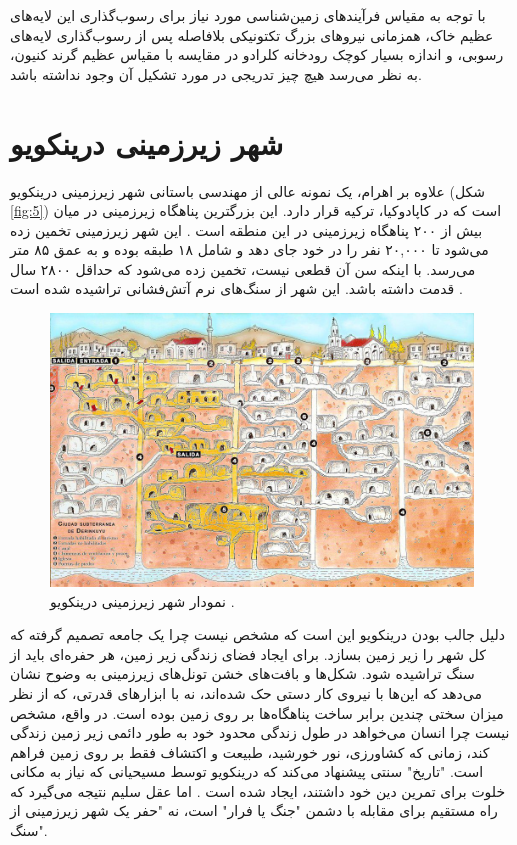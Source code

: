 \documentclass[10pt,twocolumn,letterpaper]{article}
\begin{document}
با توجه به مقیاس فرآیندهای زمین‌شناسی مورد نیاز برای رسوب‌گذاری این لایه‌های عظیم خاک، همزمانی نیروهای بزرگ تکتونیکی بلافاصله پس از رسوب‌گذاری لایه‌های رسوبی، و اندازه بسیار کوچک رودخانه کلرادو در مقایسه با مقیاس عظیم گرند کنیون، به نظر می‌رسد هیچ چیز تدریجی در مورد تشکیل آن وجود نداشته باشد.

\section{شهر زیرزمینی درینکویو}

علاوه بر اهرام، یک نمونه عالی از مهندسی باستانی شهر زیرزمینی درینکویو (شکل \ref{fig:5}) است که در کاپادوکیا، ترکیه قرار دارد. این بزرگترین پناهگاه زیرزمینی در میان بیش از ۲۰۰ پناهگاه زیرزمینی در این منطقه است \cite{54}. این شهر زیرزمینی تخمین زده می‌شود تا ۲۰,۰۰۰ نفر را در خود جای دهد و شامل ۱۸ طبقه بوده و به عمق ۸۵ متر می‌رسد. با اینکه سن آن قطعی نیست، تخمین زده می‌شود که حداقل ۲۸۰۰ سال قدمت داشته باشد. این شهر از سنگ‌های نرم آتش‌فشانی تراشیده شده است \cite{52, 53}.

\begin{figure}[b]
\begin{center}
   \includegraphics[width=1\linewidth]{derinkuyu.jpeg}
\end{center}
   \caption{نمودار شهر زیرزمینی درینکویو \cite{56}.}
\label{fig:5}
\label{fig:onecol}
\end{figure}
دلیل جالب بودن درینکویو این است که مشخص نیست چرا یک جامعه تصمیم گرفته که کل شهر را زیر زمین بسازد. برای ایجاد فضای زندگی زیر زمین، هر حفره‌ای باید از سنگ تراشیده شود. شکل‌ها و بافت‌های خشن تونل‌های زیرزمینی به وضوح نشان می‌دهد که این‌ها با نیروی کار دستی حک شده‌اند، نه با ابزارهای قدرتی، که از نظر میزان سختی چندین برابر ساخت پناهگاه‌ها بر روی زمین بوده است. در واقع، مشخص نیست چرا انسان می‌خواهد در طول زندگی محدود خود به طور دائمی زیر زمین زندگی کند، زمانی که کشاورزی، نور خورشید، طبیعت و اکتشاف فقط بر روی زمین فراهم است. "تاریخ" سنتی پیشنهاد می‌کند که درینکویو توسط مسیحیانی که نیاز به مکانی خلوت برای تمرین دین خود داشتند، ایجاد شده است \cite{53}. اما عقل سلیم نتیجه می‌گیرد که راه مستقیم برای مقابله با دشمن "جنگ یا فرار" است، نه "حفر یک شهر زیرزمینی از سنگ".
\end{document}
